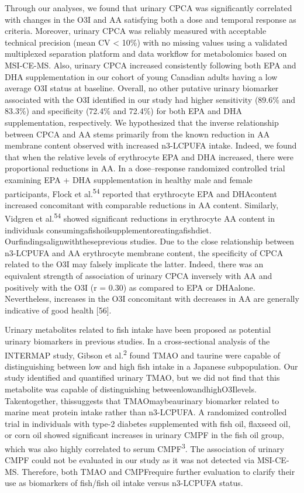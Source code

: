 \documentclass[journal=jacsat,manuscript=article]{achemso}
\begin{document}
Through our analyses, we found that urinary CPCA was significantly
correlated with changes in the O3I and AA satisfying both a dose and
temporal response as criteria. Moreover, urinary CPCA was reliably
measured with acceptable technical precision (mean CV \textless{} 10\%)
with no missing values using a validated multiplexed separation platform
and data workflow for metabolomics based on MSI-CE-MS. Also, urinary
CPCA increased consistently following both EPA and DHA supplementation
in our cohort of young Canadian adults having a low average O3I status
at baseline. Overall, no other putative urinary biomarker associated
with the O3I identified in our study had higher sensitivity (89.6\% and
83.3\%) and specificity (72.4\% and 72.4\%) for both EPA and DHA
supplementation, respectively. We hypothesized that the inverse
relationship between CPCA and AA stems primarily from the known
reduction in AA membrane content observed with increased n3-LCPUFA
intake. Indeed, we found that when the relative levels of erythrocyte
EPA and DHA increased, there were proportional reductions in AA. In a
dose--response randomized controlled trial examining EPA + DHA
supplementation in healthy male and female participants, Flock et
al.\textsuperscript{54} reported that erythrocyte EPA and DHAcontent
increased concomitant with comparable reductions in AA content.
Similarly, Vidgren et al.\textsuperscript{54} showed significant
reductions in erythrocyte AA content in individuals
consumingafishoilsupplementoreatingafishdiet.
Ourfindingsalignwiththeseprevious studies. Due to the close relationship
between n3-LCPUFA and AA erythrocyte membrane content, the specificity
of CPCA related to the O3I may falsely implicate the latter. Indeed,
there was an equivalent strength of association of urinary CPCA
inversely with AA and positively with the O3I (r = 0.30) as compared to
EPA or DHAalone. Nevertheless, increases in the O3I concomitant with
decreases in AA are generally indicative of good health {[}56{]}.

Urinary metabolites related to fish intake have been proposed as
potential urinary biomarkers in previous studies. In a cross-sectional
analysis of the INTERMAP study, Gibson et al.\textsuperscript{2} found
TMAO and taurine were capable of distinguishing between low and high
fish intake in a Japanese subpopulation. Our study identified and
quantified urinary TMAO, but we did not find that this metabolite was
capable of distinguishing betweenlowandhighO3Ilevels. Takentogether,
thissuggests that TMAOmaybeaurinary biomarker related to marine meat
protein intake rather than n3-LCPUFA. A randomized controlled trial in
individuals with type-2 diabetes supplemented with fish oil, flaxseed
oil, or corn oil showed significant increases in urinary CMPF in the
fish oil group, which was also highly correlated to serum
CMPF\textsuperscript{3}. The association of urinary CMPF could not be
evaluated in our study as it was not detected via MSI-CE-MS. Therefore,
both TMAO and CMPFrequire further evaluation to clarify their use as
biomarkers of fish/fish oil intake versus n3-LCPUFA status.
\end{document}
